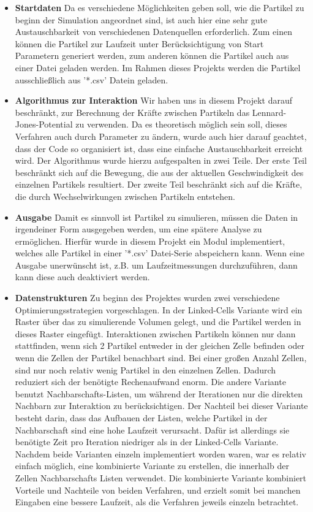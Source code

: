 \documentclass[
	12pt,
	a4paper,
	BCOR10mm,
	DIV14,
	headsepline,
]{scrreprt}
\begin{document}
\begin{itemize}
	\item \textbf{Startdaten} Da es verschiedene Möglichkeiten geben soll, wie die Partikel zu beginn der Simulation angeordnet sind, ist auch hier eine sehr gute Austauschbarkeit von verschiedenen Datenquellen erforderlich. Zum einen können die Partikel zur Laufzeit unter Berücksichtigung von Start Parametern generiert werden, zum anderen können die Partikel auch aus einer Datei geladen werden. Im Rahmen dieses Projekts werden die Partikel ausschließlich aus '*.csv' Datein geladen.
	\item \textbf{Algorithmus zur Interaktion} Wir haben uns in diesem Projekt darauf beschränkt, zur Berechnung der Kräfte zwischen Partikeln das Lennard-Jones-Potential zu verwenden. Da es theoretisch möglich sein soll, dieses Verfahren auch durch Parameter zu ändern, wurde auch hier darauf geachtet, dass der Code so organisiert ist, dass eine einfache Austauschbarkeit erreicht wird. Der Algorithmus wurde hierzu aufgespalten in zwei Teile. Der erste Teil beschränkt sich auf die Bewegung, die aus der aktuellen Geschwindigkeit des einzelnen Partikels resultiert. Der zweite Teil beschränkt sich auf die Kräfte, die durch Wechselwirkungen zwischen Partikeln entstehen.
	\item \textbf{Ausgabe} Damit es sinnvoll ist Partikel zu simulieren, müssen die Daten in irgendeiner Form ausgegeben werden, um eine spätere Analyse zu ermöglichen. Hierfür wurde in diesem Projekt ein Modul implementiert, welches alle Partikel in einer '*.csv' Datei-Serie abspeichern kann. Wenn eine Ausgabe unerwünscht ist, z.B. um Laufzeitmessungen durchzuführen, dann kann diese auch deaktiviert werden.
	\item \textbf{Datenstrukturen} Zu beginn des Projektes wurden zwei verschiedene Optimierungsstrategien vorgeschlagen. In der Linked-Cells Variante wird ein Raster über das zu simulierende Volumen gelegt, und die Partikel werden in dieses Raster eingefügt. Interaktionen zwischen Partikeln können nur dann stattfinden, wenn sich 2 Partikel entweder in der gleichen Zelle befinden oder wenn die Zellen der Partikel benachbart sind. Bei einer großen Anzahl Zellen, sind nur noch relativ wenig Partikel in den einzelnen Zellen. Dadurch reduziert sich der benötigte Rechenaufwand enorm. Die andere Variante benutzt Nachbarschafts-Listen, um während der Iterationen nur die direkten Nachbarn zur Interaktion zu berücksichtigen. Der Nachteil bei dieser Variante besteht darin, dass das Aufbauen der Listen, welche Partikel in der Nachbarschaft sind eine hohe Laufzeit verursacht. Dafür ist allerdings sie benötigte Zeit pro Iteration niedriger als in der Linked-Cells Variante. Nachdem beide Varianten einzeln implementiert worden waren, war es relativ einfach möglich, eine kombinierte Variante zu erstellen, die innerhalb der Zellen Nachbarschafts Listen verwendet. Die kombinierte Variante kombiniert Vorteile und Nachteile von beiden Verfahren, und erzielt somit bei manchen Eingaben eine bessere Laufzeit, als die Verfahren jeweils einzeln betrachtet.

\end{itemize}
\end{document}
